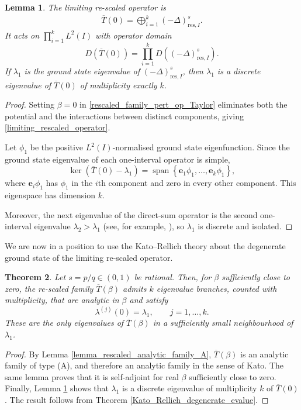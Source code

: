 \documentclass[preprint,12pt]{elsarticle}
\newtheorem{theorem}{Theorem}[section]
\newcommand{\fvect}[1]{\mathbf{#1}}
\newtheorem{lemma}[theorem]{Lemma}
\begin{document}
\begin{lemma}\label{limiting_rescaled_ground_state_degenerate}
The limiting re-scaled operator is
\begin{align}\label{limiting_rescaled_operator}
    \overline{T}(0)
    =\bigoplus_{i=1}^k(-\Delta)^s_{\mathrm{res},I}.
\end{align}
It acts on $\prod_{i=1}^kL^2(I)$ with operator domain
\[
    D(\overline{T}(0))
    =\prod_{i=1}^kD\!\left((-\Delta)^s_{\mathrm{res},I}\right).
\]
If $\lambda_1$ is the ground state eigenvalue of
$(-\Delta)^s_{\mathrm{res},I}$, then $\lambda_1$ is a discrete
eigenvalue of $\overline{T}(0)$ of multiplicity exactly $k$.
\end{lemma}

\begin{proof}
Setting $\beta=0$ in
\eqref{rescaled_family_pert_op_Taylor} eliminates both the potential
and the interactions between distinct components, giving
\eqref{limiting_rescaled_operator}.

Let $\phi_1$ be the positive $L^2(I)$-normalised ground state
eigenfunction. Since the ground state eigenvalue of each one-interval
operator is simple,
\[
    \ker(\overline{T}(0)-\lambda_1)
    =
    \operatorname{span}
    \left\{
        \fvect{e}_1\phi_1,\ldots,\fvect{e}_k\phi_1
    \right\},
\]
where $\fvect{e}_i\phi_1$ has $\phi_1$ in the $i$th component and zero
in every other component. This eigenspace has dimension $k$.

Moreover, the next eigenvalue of the direct-sum operator is the second
one-interval eigenvalue $\lambda_2>\lambda_1$ (see, for example, \cite{BK}), so $\lambda_1$ is
discrete and isolated.
\end{proof}

We are now in a position to use the Kato--Rellich theory about the degenerate ground state of the limiting re-scaled operator.
\begin{theorem}\label{rescaled_op_existence_pert_evalues}
Let $s=p/q\in(0,1)$ be rational. Then, for $\beta$ sufficiently close to zero, the re-scaled family $\overline{T}(\beta)$ admits $k$ eigenvalue branches, counted with multiplicity, that are analytic in $\beta$ and satisfy
\[
    \lambda^{(j)}(0)=\lambda_1,
    \qquad j=1,\ldots,k.
\]
These are the only eigenvalues of $\overline{T}(\beta)$ in a sufficiently small neighbourhood of $\lambda_1$.
\end{theorem}
\begin{proof}
By Lemma \ref{lemma_rescaled_analytic_family_A}, $\overline{T}(\beta)$ is an analytic family of type (A), and therefore an analytic family in the sense of Kato. The same lemma proves that it is self-adjoint for real $\beta$ sufficiently close to zero. Finally, Lemma \ref{limiting_rescaled_ground_state_degenerate} shows that $\lambda_1$ is a discrete eigenvalue of multiplicity $k$ of $\overline{T}(0)$. The result follows from Theorem \ref{Kato_Rellich_degenerate_evalue}.
\end{proof}
\end{document}

